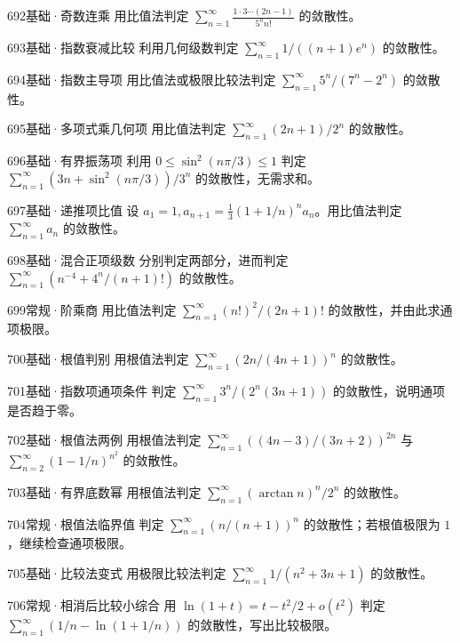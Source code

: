 \begin{exercise}{692}{基础·奇数连乘}
用比值法判定 $\sum_{n=1}^{\infty}\frac{1\cdot3\cdots(2n-1)}{5^nn!}$ 的敛散性。
\end{exercise}
\begin{exercise}{693}{基础·指数衰减比较}
利用几何级数判定 $\sum_{n=1}^{\infty}1/((n+1)e^n)$ 的敛散性。
\end{exercise}
\begin{exercise}{694}{基础·指数主导项}
用比值法或极限比较法判定 $\sum_{n=1}^{\infty}5^n/(7^n-2^n)$ 的敛散性。
\end{exercise}
\begin{exercise}{695}{基础·多项式乘几何项}
用比值法判定 $\sum_{n=1}^{\infty}(2n+1)/2^n$ 的敛散性。
\end{exercise}
\begin{exercise}{696}{基础·有界振荡项}
利用 $0\leq\sin^2(n\pi/3)\leq1$ 判定 $\sum_{n=1}^{\infty}(3n+\sin^2(n\pi/3))/3^n$ 的敛散性，无需求和。
\end{exercise}
\begin{exercise}{697}{基础·递推项比值}
设 $a_1=1,a_{n+1}=\frac13(1+1/n)^n a_n$。用比值法判定 $\sum_{n=1}^{\infty}a_n$ 的敛散性。
\end{exercise}
\begin{exercise}{698}{基础·混合正项级数}
分别判定两部分，进而判定 $\sum_{n=1}^{\infty}(n^{-4}+4^n/(n+1)!)$ 的敛散性。
\end{exercise}
\begin{exercise}{699}{常规·阶乘商}
用比值法判定 $\sum_{n=1}^{\infty}(n!)^2/(2n+1)!$ 的敛散性，并由此求通项极限。
\end{exercise}
\begin{exercise}{700}{基础·根值判别}
用根值法判定 $\sum_{n=1}^{\infty}(2n/(4n+1))^n$ 的敛散性。
\end{exercise}
\begin{exercise}{701}{基础·指数项通项条件}
判定 $\sum_{n=1}^{\infty}3^n/(2^n(3n+1))$ 的敛散性，说明通项是否趋于零。
\end{exercise}
\begin{exercise}{702}{基础·根值法两例}
用根值法判定 $\sum_{n=1}^{\infty}((4n-3)/(3n+2))^{2n}$ 与 $\sum_{n=2}^{\infty}(1-1/n)^{n^2}$ 的敛散性。
\end{exercise}
\begin{exercise}{703}{基础·有界底数幂}
用根值法判定 $\sum_{n=1}^{\infty}(\arctan n)^n/2^n$ 的敛散性。
\end{exercise}
\begin{exercise}{704}{常规·根值法临界值}
判定 $\sum_{n=1}^{\infty}(n/(n+1))^n$ 的敛散性；若根值极限为 $1$，继续检查通项极限。
\end{exercise}
\begin{exercise}{705}{基础·比较法变式}
用极限比较法判定 $\sum_{n=1}^{\infty}1/(n^2+3n+1)$ 的敛散性。
\end{exercise}
\begin{exercise}{706}{常规·相消后比较小综合}
用 $\ln(1+t)=t-t^2/2+o(t^2)$ 判定 $\sum_{n=1}^{\infty}(1/n-\ln(1+1/n))$ 的敛散性，写出比较极限。
\end{exercise}
